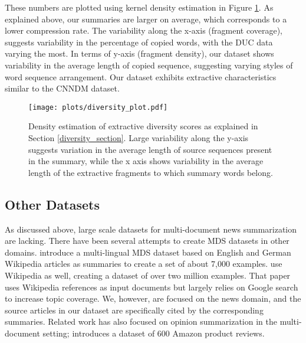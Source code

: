 \documentclass[11pt,a4paper]{article}
\begin{document}
These numbers are plotted using kernel density estimation in Figure \ref{fig:diversity}. As explained above, our summaries are larger on average, which corresponds to a lower compression rate. The variability along the x-axis (fragment coverage), suggests variability in the percentage of copied words, with the DUC data varying the most. In terms of y-axis (fragment density), our dataset shows variability in the average length of copied sequence, suggesting varying styles of word sequence arrangement. Our dataset exhibits extractive characteristics similar to the CNNDM dataset. 


    


\begin{figure}[t]
    \centering
    \texttt{[image: plots/diversity\_plot.pdf]}
    \caption{ Density estimation of extractive diversity scores as explained in Section \ref{diversity_section}. Large variability along the y-axis suggests variation in the average length of source sequences present in the summary, while the x axis shows variability in the average length of the extractive fragments to which summary words belong.
    }
    \label{fig:diversity}
    \vspace{-4mm}
\end{figure} 















\subsection{Other Datasets}
As discussed above, large scale datasets for multi-document news summarization are lacking. There have been several attempts to create MDS datasets in other domains.  introduce a multi-lingual MDS dataset based on English and German Wikipedia articles as summaries to create a set of about 7,000 examples.  use Wikipedia as well, creating a dataset of over two million examples. That paper uses Wikipedia references as input documents but largely relies on Google search to increase topic coverage. We, however, are focused on the news domain, and the source articles in our dataset are specifically cited by the corresponding summaries. Related work has also focused on opinion summarization in the multi-document setting;  introduces a dataset of 600 Amazon product reviews.
\end{document}

